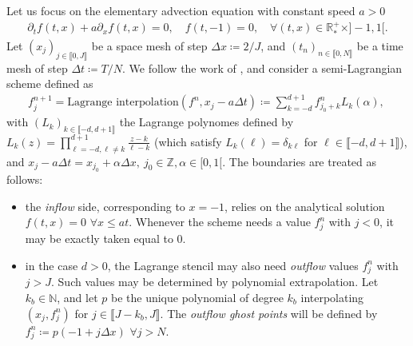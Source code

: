 \documentclass{article}
\numberwithin{equation}{section}
\newcommand{\N}{\mathbb{N}}
\newcommand{\R}{\mathbb{R}}
\begin{document}
Let us focus on the elementary advection equation with constant speed $a>0$
\begin{align*}
	\partial_t f (t,x) + a \partial_x f(t,x) = 0, \quad f(t,-1) = 0, \quad \forall (t,x) \in \R^+_* \times ]-1,1[.
\end{align*}
Let $(x_j)_{j\in\llbracket0,J\rrbracket}$ be a space mesh of step $\Delta x \coloneqq 2/J$, and $(t_n)_{n\in\llbracket 0,N \rrbracket}$ be a time mesh of step $\Delta t \coloneqq T/N$.
We follow the work of \cite{coulombelNeumannNumericalBoundary2020}, and consider a semi-Lagrangian scheme defined as
\begin{align*}
	f^{n+1}_j = \text{Lagrange interpolation}\left(f^n, x_j - a \Delta t\right) \coloneqq \sum_{k=-d}^{d+1} f^n_{j_0+k} L_k (\alpha), \ 
\end{align*}
with $(L_k)_{k\in\llbracket-d,d+1\rrbracket}$ the Lagrange polynomes defined by $L_k(z)=\prod_{\ell=-d,\ell\not=k}^{d+1}\frac{z-k}{\ell-k}$
(which satisfy $L_k(\ell) = \delta_{k\ell}$ for $\ell\in \llbracket-d,d+1\rrbracket$), and $x_j - a \Delta t = x_{j_0}+\alpha \Delta x,\ j_0\in \mathbb{Z}, \alpha\in [0,1[$.
The boundaries are treated as follows:
\begin{itemize}
\item the \emph{inflow} side, corresponding to $x=-1$, relies on the analytical solution $f(t,x) = 0$ $\forall x \leqslant a t$. Whenever the scheme needs a value $f^n_j$ with $j < 0$, it may be exactly taken equal to 0.
\item in the case $d>0$, the Lagrange stencil may also need \emph{outflow} values $f^n_{j}$ with $j>J$. Such values may be determined by polynomial extrapolation. Let $k_b \in \N$, and let $p$ be the unique polynomial of degree $k_b$ interpolating $(x_j, f^n_j)$ for $j\in \llbracket J-k_b,J\rrbracket$. The \emph{outflow ghost points} will be defined by $f^n_j \coloneqq p(-1 + j \Delta x)$ $\forall j > N$. 
\end{itemize}
\end{document}

